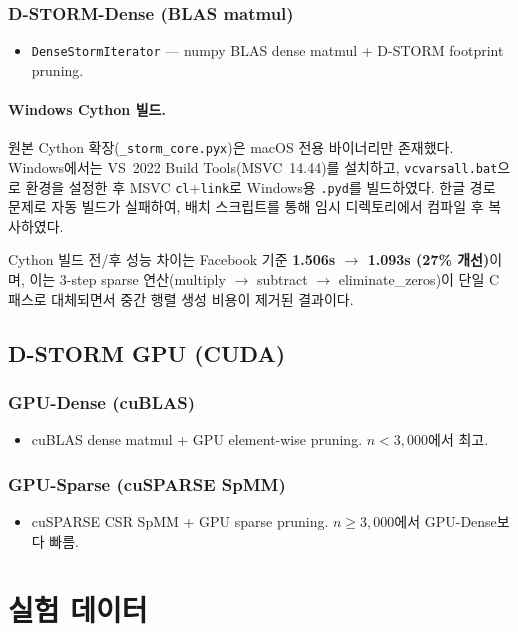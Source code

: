 \documentclass[11pt,a4paper]{article}
\begin{document}
\subsubsection{D-STORM-Dense (BLAS matmul)}
\begin{itemize}[leftmargin=1.4em]
  \item \texttt{DenseStormIterator} --- numpy BLAS dense matmul + D-STORM footprint pruning.
\end{itemize}

\paragraph{Windows Cython 빌드.}
원본 Cython 확장(\texttt{\_storm\_core.pyx})은 macOS 전용 바이너리만 존재했다.
Windows에서는 VS~2022 Build Tools(MSVC~14.44)를 설치하고, \texttt{vcvarsall.bat}으로 환경을 설정한 후 MSVC \texttt{cl}+\texttt{link}로 Windows용 \texttt{.pyd}를 빌드하였다.
한글 경로 문제로 자동 빌드가 실패하여, 배치 스크립트를 통해 임시 디렉토리에서 컴파일 후 복사하였다.

Cython 빌드 전/후 성능 차이는 Facebook 기준 \textbf{1.506s $\to$ 1.093s (27\% 개선)}이며, 이는 3-step sparse 연산(multiply $\to$ subtract $\to$ eliminate\_zeros)이 단일 C 패스로 대체되면서 중간 행렬 생성 비용이 제거된 결과이다.

\subsection{D-STORM GPU (CUDA)}
\subsubsection{GPU-Dense (cuBLAS)}
\begin{itemize}[leftmargin=1.4em]
  \item cuBLAS dense matmul + GPU element-wise pruning. $n < 3{,}000$에서 최고.
\end{itemize}
\subsubsection{GPU-Sparse (cuSPARSE SpMM)}
\begin{itemize}[leftmargin=1.4em]
  \item cuSPARSE CSR SpMM + GPU sparse pruning. $n \geq 3{,}000$에서 GPU-Dense보다 빠름.
\end{itemize}

\section{실험 데이터}
\end{document}
